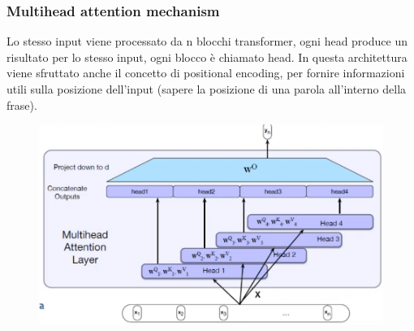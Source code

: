 \subsubsection{Multihead attention mechanism}
Lo stesso input viene processato da n blocchi transformer, ogni head produce un risultato per lo stesso input, ogni blocco è chiamato head. In questa architettura viene sfruttato anche il concetto di positional encoding, per fornire informazioni utili sulla posizione dell'input (sapere la posizione di una parola all'interno della frase). 
\\
\begin{figure}[th]
    \centering
    \includegraphics[scale=0.5]{Text Analysis/img/multihead.png}
\end{figure}
\\